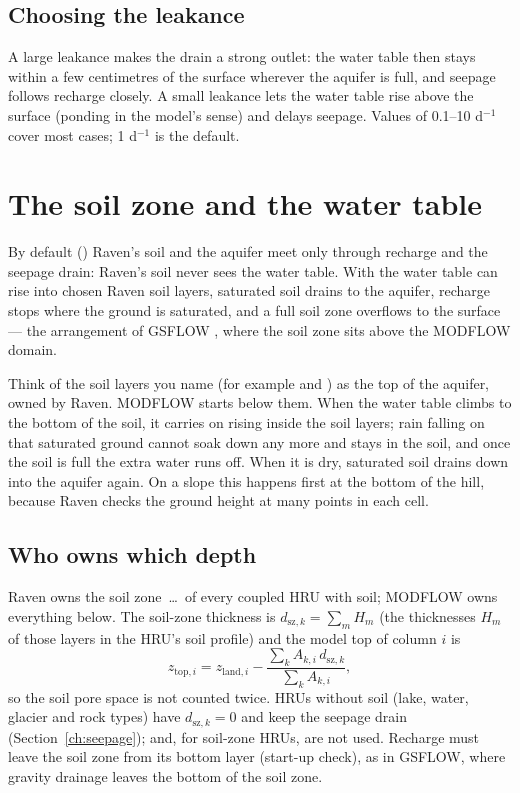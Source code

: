 \subsection{Choosing the leakance}
A large leakance makes the drain a strong outlet: the water table then stays within a few centimetres of the surface wherever
the aquifer is full, and seepage follows recharge closely. A small leakance lets the water table rise above the surface
(ponding in the model's sense) and delays seepage. Values of 0.1--10 d$^{-1}$ cover most cases; 1 d$^{-1}$ is the default.

\section{The soil zone and the water table}\label{ch:soilzone}
By default () Raven's soil and the aquifer meet only through recharge and the seepage drain:
Raven's soil never sees the water table. With  the water table can rise into chosen Raven soil
layers, saturated soil drains to the aquifer, recharge stops where the ground is saturated, and a full soil zone
overflows to the surface --- the arrangement of GSFLOW \cite{markstrom2008gsflow}, where the soil zone sits above the
MODFLOW domain.

\begin{plain}
Think of the soil layers you name (for example  and ) as the top of the aquifer, owned by
Raven. MODFLOW starts below them. When the water table climbs to the bottom of the soil, it carries on rising inside the
soil layers; rain falling on that saturated ground cannot soak down any more and stays in the soil, and once the soil is
full the extra water runs off. When it is dry, saturated soil drains down into the aquifer again. On a slope this
happens first at the bottom of the hill, because Raven checks the ground height at many points in each cell.
\end{plain}

\subsection{Who owns which depth}
Raven owns the soil zone \,\dots\, of every coupled HRU with soil; MODFLOW owns everything
below. The soil-zone thickness is $d_{\mathrm{sz},k}=\sum_mH_m$ (the thicknesses $H_m$ of those layers in the HRU's soil profile) and the
model top of column $i$ is
\begin{equation}
z_{\mathrm{top},i}=z_{\mathrm{land},i}-\frac{\sum_kA_{k,i}\,d_{\mathrm{sz},k}}{\sum_kA_{k,i}},
\end{equation}
so the soil pore space is not counted twice. HRUs without soil (lake, water, glacier and rock types) have $d_{\mathrm{sz},k}=0$ and
keep the seepage drain (Section~\ref{ch:seepage});  and, for soil-zone HRUs,
 are not used. Recharge must leave the soil zone from its bottom layer 
(start-up check), as in GSFLOW, where gravity drainage leaves the bottom of the soil zone.

